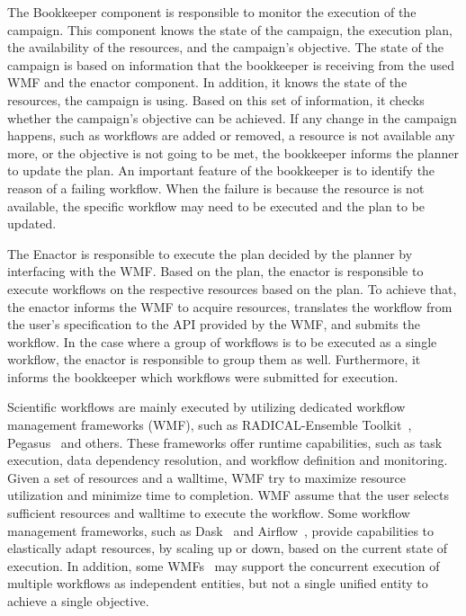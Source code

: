 The Bookkeeper component is responsible to monitor the execution of the campaign.
This component knows the state of the campaign, the execution plan, the availability of the resources, and the campaign's objective.
The state of the campaign is based on information that the bookkeeper is receiving from the used WMF and the enactor component.
In addition, it knows the state of the resources, the campaign is using.
Based on this set of information, it checks whether the campaign's objective can be achieved.
If any change in the campaign happens, such as workflows are added or removed, a resource is not available any more, or the objective is not going to be met, the bookkeeper informs the planner to update the plan.
An important feature of the bookkeeper is to identify the reason of a failing workflow.
When the failure is because the resource is not available, the specific workflow may need to be executed and the plan to be updated.

The Enactor is responsible to execute the plan decided by the planner by interfacing with the WMF.
Based on the plan, the enactor is responsible to execute workflows on the respective resources based on the plan.
To achieve that, the enactor informs the WMF to acquire resources, translates the workflow from the user's specification to the API provided by the WMF, and submits the workflow.
In the case where a group of workflows is to be executed as a single workflow, the enactor is responsible to group them as well.
Furthermore, it informs the bookkeeper which workflows were submitted for execution.


Scientific workflows are mainly executed by utilizing dedicated workflow management frameworks (WMF), such as RADICAL-Ensemble Toolkit~\cite{balasubramanian2018harnessing}, Pegasus~\cite{deelman2015pegasus} and others.
These frameworks offer runtime capabilities, such as task execution, data dependency resolution, and workflow definition and monitoring.
Given a set of resources and a walltime, WMF try to maximize resource utilization and minimize time to completion.
WMF assume that the user selects sufficient resources and walltime to execute the workflow.
Some workflow management frameworks, such as Dask~\cite{rocklin2015dask} and Airflow~\cite{airflow}, provide capabilities to elastically adapt resources, by scaling up or down, based on the current state of execution.
In addition, some  WMFs~\cite{deelman2015pegasus} may support the concurrent execution of multiple workflows as independent entities, but not a single unified entity to achieve a single objective.

